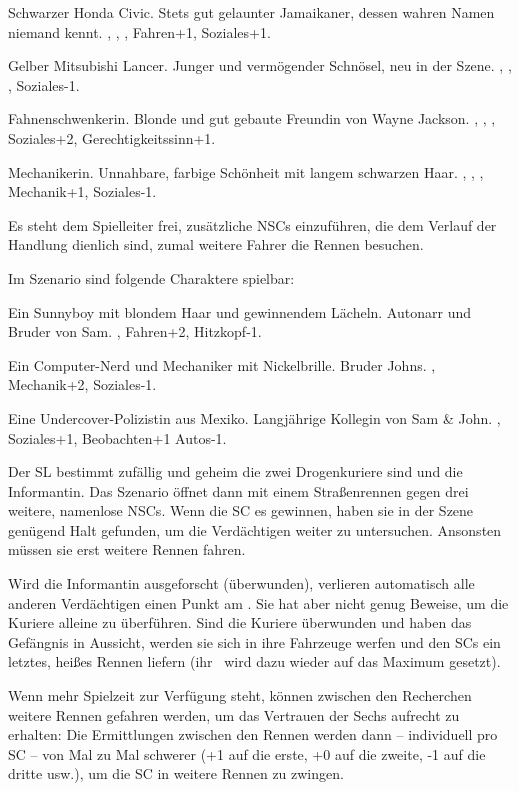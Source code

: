 {		 Schwarzer Honda Civic. Stets gut gelaunter Jamaikaner, dessen wahren Namen niemand kennt. , , , Fahren+1, Soziales+1.

		 Gelber Mitsubishi Lancer. Junger und vermögender Schnösel, neu in der Szene. , , , Soziales-1.

		 Fahnenschwenkerin. Blonde und gut gebaute Freundin von Wayne Jackson. , , , Soziales+2, Gerechtigkeitssinn+1.

		 Mechanikerin. Unnahbare, farbige Schönheit mit langem schwarzen Haar. , , , Mechanik+1, Soziales-1.

		Es steht dem Spielleiter frei, zusätzliche NSCs einzuführen, die dem Verlauf der Handlung dienlich sind, zumal weitere Fahrer die Rennen besuchen.


		\noindent
		Im Szenario sind folgende Charaktere spielbar:

		 Ein Sunnyboy mit blondem Haar und gewinnendem Lächeln. Autonarr und Bruder von Sam. , Fahren+2, Hitzkopf-1.

		 Ein Computer-Nerd und Mechaniker mit Nickelbrille. Bruder Johns. , Mechanik+2, Soziales-1.

		 Eine Undercover-Polizistin aus Mexiko. Langjährige Kollegin von Sam \& John. , Soziales+1, Beobachten+1 Autos-1.


		\noindent
		Der SL bestimmt zufällig und geheim die zwei Drogenkuriere sind und die Informantin. Das Szenario öffnet dann mit einem Straßenrennen gegen drei weitere, namenlose NSCs. Wenn die SC es gewinnen, haben sie in der Szene genügend Halt gefunden, um die Verdächtigen weiter zu untersuchen. Ansonsten müssen sie erst weitere Rennen fahren.

		Wird die Informantin ausgeforscht (überwunden), verlieren automatisch alle anderen Verdächtigen einen Punkt am \HD. Sie hat aber nicht genug Beweise, um die Kuriere alleine zu überführen. Sind die Kuriere überwunden und haben das Gefängnis in Aussicht, werden sie sich in ihre Fahrzeuge werfen und den SCs ein letztes, heißes Rennen liefern (ihr \HD\ wird dazu wieder auf das Maximum gesetzt).

		 Wenn mehr Spielzeit zur Verfügung steht, können zwischen den Recherchen weitere Rennen gefahren werden, um das Vertrauen der Sechs aufrecht zu erhalten: Die Ermittlungen zwischen den Rennen werden dann -- individuell pro SC -- von Mal zu Mal schwerer (+1 auf die erste, +0 auf die zweite, -1 auf die dritte usw.), um die SC in weitere Rennen zu zwingen.

}
